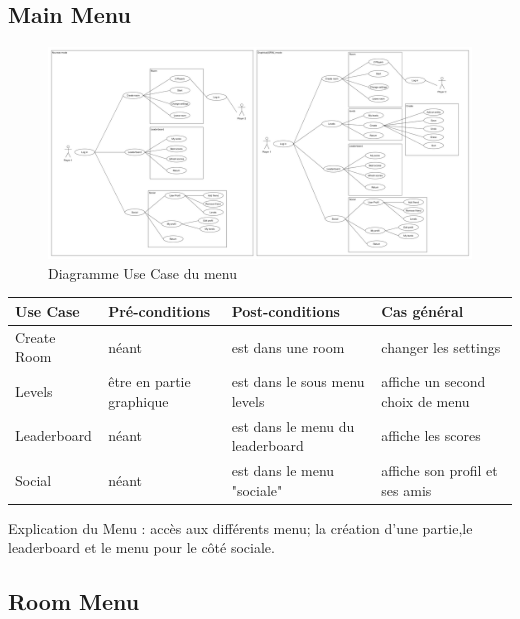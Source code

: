 \documentclass[french]{article}
\begin{document}
\clearpage
\begin{flushleft}
\subsection{Main Menu}
\end{flushleft}
\begin{figure}[!htbp]
    \centering
    \includegraphics[scale=0.21, angle=90,origin=c]{use_case/use-case-menu.png}
    \caption{Diagramme Use Case du menu}
    \label{use case:main menu}
\end{figure}
\newpage   
\begin{longtable}{|p{}|p{}|p{}|p{}|}
  \toprule
  \rowcolor{lightgray}
  \textbf{Use Case} & \textbf{Pré-conditions} & \textbf{Post-conditions}& \textbf{Cas général}\\
  \midrule
  Create Room & néant & est dans une room & changer les settings\\
  \hline
  Levels   & être en partie graphique & est dans le sous menu levels & affiche un second choix de menu \\
  \hline
  Leaderboard & néant & est dans le menu du leaderboard & affiche les scores\\
  \hline
  Social      & néant & est dans le menu "sociale"      & affiche son profil et ses amis\\
  \bottomrule
\end{longtable}
\begin{center}
Explication du Menu : accès aux différents menu; la création d'une partie,le leaderboard et le menu pour le côté sociale.
\end{center}
\begin{flushleft}
\subsection{Room Menu}
\end{flushleft}
\end{document}
